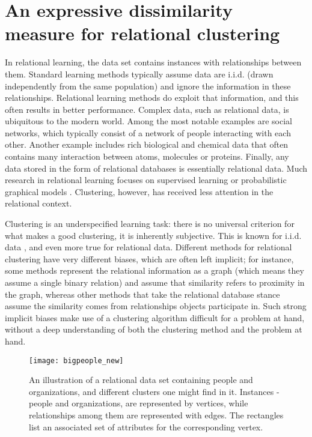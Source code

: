 \chapter{An expressive dissimilarity measure for relational clustering}\label{ch:clustering}


In relational learning, the data set contains instances with relationships between them.  
Standard learning methods typically assume data are i.i.d. (drawn independently from the same population) and ignore the information in these relationships.  
Relational learning methods do exploit that information, and this often results in better performance.  
Complex data, such as relational data, is ubiquitous to the modern world.
Among the most notable examples are social networks, which typically consist of a network of people interacting with each other. 
Another example includes rich biological and chemical data that often contains many interaction between atoms, molecules or proteins.
Finally, any data stored in the form of relational databases is essentially  relational data.
Much research in relational learning focuses on supervised learning \cite{LucRLbook} or probabilistic graphical models \cite{GetoorSRL}.  
Clustering, however, has received less attention in the relational context. 


Clustering is an underspecified learning task: there is no universal criterion for what makes a good clustering, it is inherently subjective.  
This is known for i.i.d. data \cite{Estivill-Castro:2002}, and even more true for relational data.  
Different methods for relational clustering have very different biases, which are often left implicit; for instance, some methods represent the relational information as a graph (which means they assume a single binary relation) and assume that similarity refers to proximity in the graph, whereas other methods that take the relational database stance assume the similarity comes from relationships objects participate in.
Such strong implicit biases make use of a clustering algorithm difficult for a problem at hand, without a deep understanding of both the clustering method and the problem at hand.

\begin{figure}
  \centering
  \medskip
  \texttt{[image: bigpeople\_new]}
  \caption{An illustration of a relational data set containing people and organizations, and different clusters one might find in it. Instances - people and organizations, are represented by vertices, while relationships among them are represented with edges. The rectangles list an associated set of attributes for the corresponding vertex.}
  \label{fig:clustering:intro}
\end{figure}


